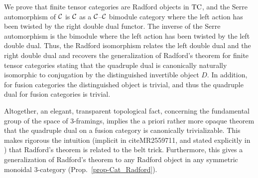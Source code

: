 \documentclass{amsart}
\begin{document}
We prove that finite tensor categories are Radford objects in $\mathrm{TC}$, and the Serre automorphism of $\mathcal C$ is $\mathcal C$ as a $\mathcal C$--$\mathcal C$ bimodule category where the left action has been twisted by the right double dual functor.  The inverse of the Serre automorphism is the bimodule where the left action has been twisted by the left double dual.  Thus, the Radford isomorphism relates the left double dual and the right double dual and recovers the generalization of Radford's theorem for finite tensor categories \cite{MR0407069, MR2097289} stating that the quadruple dual is canonically naturally isomorphic to conjugation by the distinguished invertible object $D$.  In addition, for fusion categories the distinguished object is trivial, and thus the quadruple dual for fusion categories is trivial.  

Altogether, an elegant, transparent topological fact, concerning the fundamental group of the space of $3$-framings, implies the a priori rather more opaque theorem that the quadruple dual on a fusion category is canonically trivializable. This makes rigorous the intuition (implicit in cite{MR2559711}, and stated explicitly in \cite{0901.3975}) that Radford's theorem is related to the belt trick.    Furthermore, this gives a generalization of Radford's theorem to any Radford object in any symmetric monoidal $3$-category (Prop.~\ref{prop-Cat_Radford}).



\end{document}

